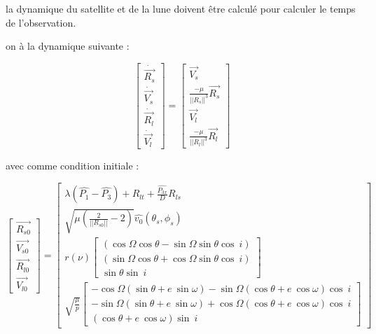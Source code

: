 \documentclass{article} %
\begin{document}
		la dynamique du satellite et de la lune doivent être calculé pour calculer le temps de l'observation.
		
		on à la dynamique suivante :
		
		$$
		\begin{bmatrix}
			\dot{\overrightarrow{R_{s}}}\\
			\dot{\overrightarrow{V_{s}}}\\
			\dot{\overrightarrow{R_{l}}}\\
			\dot{\overrightarrow{V_{l}}}
		\end{bmatrix} =\begin{bmatrix}
			\overrightarrow{V_{s}}\\
			\frac{-\mu }{||R_{s} ||^{3}}\overrightarrow{R_{s}}\\
			\overrightarrow{V_{l}}\\
			\frac{-\mu }{||R_{l} ||^{3}}\overrightarrow{R_{l}}
		\end{bmatrix}
		$$
		
		avec comme condition initiale :
		
		
		$$
		\begin{bmatrix}
			\overrightarrow{R_{s0}}\\
			\overrightarrow{V_{s0}}\\
			\overrightarrow{R_{l0}}\\
			\overrightarrow{V_{l0}}
		\end{bmatrix} =\begin{bmatrix}
			\lambda \left(\widehat{P_{1}} -\widehat{P_{3}}\right) +R_{lt} +\frac{\widehat{P_{3x}}}{D} R_{ls}\\
			\sqrt{\mu \left(\frac{2}{||R_{s0} ||} -2\right)}\widehat{v_{0}}( \theta _{s} ,\phi _{s})\\
			r( \nu )\begin{bmatrix}
				( \cos\Omega \cos\theta -\sin\Omega \sin\theta \cos\ i)\\
				( \sin\Omega \cos\theta +\cos\Omega \sin\theta \cos\ i)\\
				\sin\theta \sin\ i
			\end{bmatrix}\\
			\sqrt{\frac{\mu }{p}}\begin{bmatrix}
				-\cos\Omega ( \sin\theta +e\ \sin\omega ) -\sin\Omega ( \cos\theta +e\ \cos\omega ) \cos\ i\\
				-\sin\Omega ( \sin\theta +e\ \sin\omega ) +\cos\Omega ( \cos\theta +e\ \cos\omega ) \cos\ i\\
				( \cos\theta +e\ \cos\omega ) \sin\ i
			\end{bmatrix}
		\end{bmatrix}
		$$
		
\end{document}

